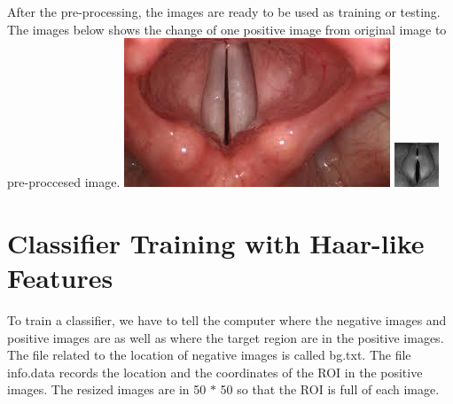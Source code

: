 \documentclass[11pt]{article}
\makeatletter
\def\maxwidth{\ifdim\Gin@nat@width>\linewidth\linewidth
    \else\Gin@nat@width\fi}
\let\Oldincludegraphics\includegraphics
\renewcommand{\includegraphics}[1]{\Oldincludegraphics[width=.8\maxwidth]{#1}}
\makeatother
\begin{document}
    After the pre-processing, the images are ready to be used as training or
testing. The images below shows the change of one positive image from
original image to pre-proccesed image.
\includegraphics{vc_training/raw_images/Closed_vocal_cord_Expansion/2.jpg}
\includegraphics{vc_training/pos5050/112.jpg}

    \hypertarget{classifier-training-with-haar-like-features}{%
\section{Classifier Training with Haar-like
Features}\label{classifier-training-with-haar-like-features}}

    To train a classifier, we have to tell the computer where the negative
images and positive images are as well as where the target region are in
the positive images. The file related to the location of negative images
is called bg.txt. The file info.data records the location and the
coordinates of the ROI in the positive images. The resized images are in
50 \(*\) 50 so that the ROI is full of each image.
\end{document}

